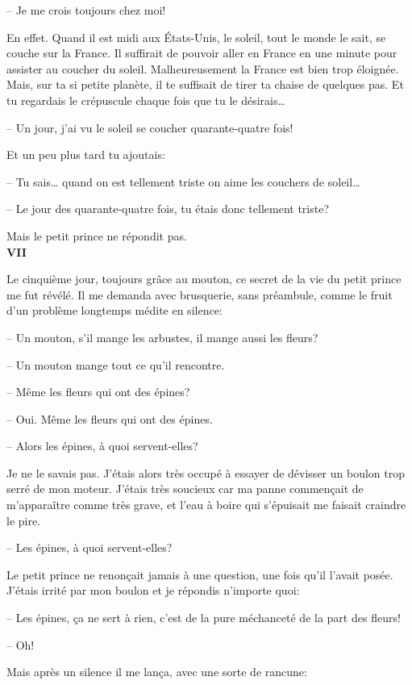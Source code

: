 \begin{Parallel}[p]{}{}
{-- Je me crois toujours chez moi!

En effet. Quand il est midi aux États-Unis, le
soleil, tout le monde le sait, se couche sur la France.
Il suffirait de pouvoir aller en France en une minute
pour assister au coucher du soleil. Malheureusement la France est bien trop éloignée. Mais, sur ta si
petite planète, il te suffisait de tirer ta chaise de
quelques pas. Et tu regardais le crépuscule chaque
fois que tu le désirais\ldots{}

-- Un jour, j'ai vu le soleil se coucher quarante-quatre fois!

Et un peu plus tard tu ajoutais:

-- Tu sais\ldots{} quand on est tellement triste on aime
les couchers de soleil\ldots{}

-- Le jour des quarante-quatre fois, tu étais donc
tellement triste?

Mais le petit prince ne répondit pas.\\

\textbf{VII}

Le cinquième jour, toujours grâce au mouton, ce
secret de la vie du petit prince me fut révélé. Il
me demanda avec brusquerie, sans préambule,
comme le fruit d'un problème longtemps médite en
silence:

-- Un mouton, s'il mange les arbustes, il mange
aussi les fleurs?

-- Un mouton mange tout ce qu'il rencontre.

-- Même les fleurs qui ont des épines?

-- Oui. Même les fleurs qui ont des épines.

-- Alors les épines, à quoi servent-elles?

Je ne le savais pas. J'étais alors très occupé à essayer de dévisser un boulon trop serré de mon
moteur. J'étais très soucieux car ma panne commençait de m'apparaître comme très grave, et l'eau à
boire qui s'épuisait me faisait craindre le pire.

-- Les épines, à quoi servent-elles?

Le petit prince ne renonçait jamais à une question, une fois qu'il l'avait posée. J'étais irrité par
mon boulon et je répondis n'importe quoi:

-- Les épines, ça ne sert à rien, c'est de la pure méchanceté de la part des fleurs!

-- Oh!

Mais après un silence il me lança, avec une sorte
de rancune:

}
\end{Parallel}
